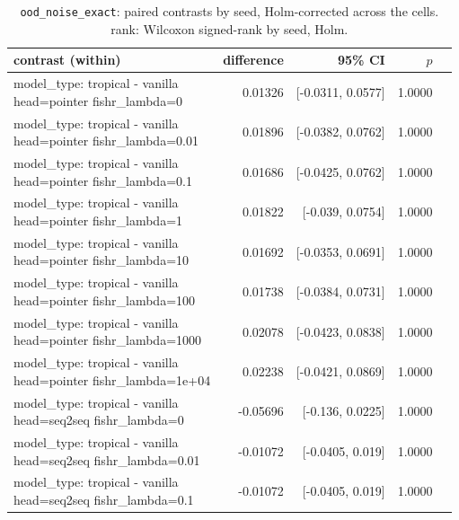 \documentclass[10pt]{article}
\makeatletter
\newcommand{\stackcell}[1]{\begin{tabular}[t]{@{}l@{}}#1\end{tabular}}
\makeatother
\begin{document}
{\small
\begin{longtable}{lrrrl}
\caption{\texttt{ood\_noise\_exact}: paired contrasts by seed, Holm-corrected across the cells. rank: Wilcoxon signed-rank by seed, Holm.}\label{tab:paired-ood_noise_exact}\\
\toprule
contrast (within) & difference & 95\% CI & $p$ & \\
\midrule
\endhead
\stackcell{model\_type: tropical - vanilla\\\footnotesize head=pointer fishr\_lambda=0 } & 0.01326 & [-0.0311, 0.0577] & 1.0000 & \\
\stackcell{model\_type: tropical - vanilla\\\footnotesize head=pointer fishr\_lambda=0.01 } & 0.01896 & [-0.0382, 0.0762] & 1.0000 & \\
\stackcell{model\_type: tropical - vanilla\\\footnotesize head=pointer fishr\_lambda=0.1 } & 0.01686 & [-0.0425, 0.0762] & 1.0000 & \\
\stackcell{model\_type: tropical - vanilla\\\footnotesize head=pointer fishr\_lambda=1 } & 0.01822 & [-0.039, 0.0754] & 1.0000 & \\
\stackcell{model\_type: tropical - vanilla\\\footnotesize head=pointer fishr\_lambda=10 } & 0.01692 & [-0.0353, 0.0691] & 1.0000 & \\
\stackcell{model\_type: tropical - vanilla\\\footnotesize head=pointer fishr\_lambda=100 } & 0.01738 & [-0.0384, 0.0731] & 1.0000 & \\
\stackcell{model\_type: tropical - vanilla\\\footnotesize head=pointer fishr\_lambda=1000 } & 0.02078 & [-0.0423, 0.0838] & 1.0000 & \\
\stackcell{model\_type: tropical - vanilla\\\footnotesize head=pointer fishr\_lambda=1e+04 } & 0.02238 & [-0.0421, 0.0869] & 1.0000 & \\
\stackcell{model\_type: tropical - vanilla\\\footnotesize head=seq2seq fishr\_lambda=0 } & -0.05696 & [-0.136, 0.0225] & 1.0000 & \\
\stackcell{model\_type: tropical - vanilla\\\footnotesize head=seq2seq fishr\_lambda=0.01 } & -0.01072 & [-0.0405, 0.019] & 1.0000 & \\
\stackcell{model\_type: tropical - vanilla\\\footnotesize head=seq2seq fishr\_lambda=0.1 } & -0.01072 & [-0.0405, 0.019] & 1.0000 & \\

\end{longtable}}
\end{document}

